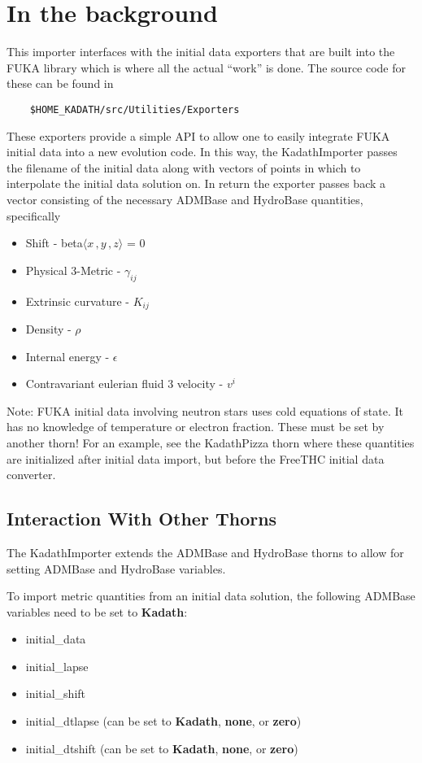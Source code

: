 \section{In the background}
This importer interfaces with the initial data exporters that are built into the
FUKA library which is where all the actual ``work'' is done.  
The source code for these can be found in
%
\begin{verbatim}
    $HOME_KADATH/src/Utilities/Exporters
\end{verbatim}
%
These exporters provide a simple API to allow one to easily integrate FUKA
initial data into a new evolution code.  In this way, the KadathImporter passes
the filename of the initial data along with vectors of points in which to interpolate
the initial data solution on.  In return the exporter passes back a vector consisting
of the necessary ADMBase and HydroBase quantities, specifically
\begin{itemize}
    \item Shift - beta$\langle x\,, y\,, z \rangle$ = 0
    \item Physical 3-Metric - $\gamma_{ij}$
    \item Extrinsic curvature - $K_{ij}$
    \item Density - $\rho$
    \item Internal energy - $\epsilon$
    \item Contravariant eulerian fluid 3 velocity - $v^i$
\end{itemize}

Note: FUKA initial data involving neutron stars uses cold equations of state.  It has no knowledge of
temperature or electron fraction.  These must be set by another thorn!  For an example, see the KadathPizza thorn\cite{fukaws} where
these quantities are initialized after initial data import, but before the FreeTHC initial data converter.

\subsection{Interaction With Other Thorns}
The KadathImporter extends the ADMBase and HydroBase thorns to allow for
setting ADMBase and HydroBase variables.

To import metric quantities from an initial data solution, the following ADMBase variables need to be set to \textbf{Kadath}:
\begin{itemize}
    \item initial\_data
    \item initial\_lapse
    \item initial\_shift
    \item initial\_dtlapse (can be set to \textbf{Kadath}, \textbf{none}, or \textbf{zero})
    \item initial\_dtshift (can be set to \textbf{Kadath}, \textbf{none}, or \textbf{zero})
\end{itemize}

